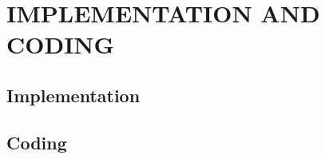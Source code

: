 \documentclass[main]{subfiles}
\begin{document}
\chapter{IMPLEMENTATION AND CODING}

\section{Implementation}

\section{Coding}
\end{document}
